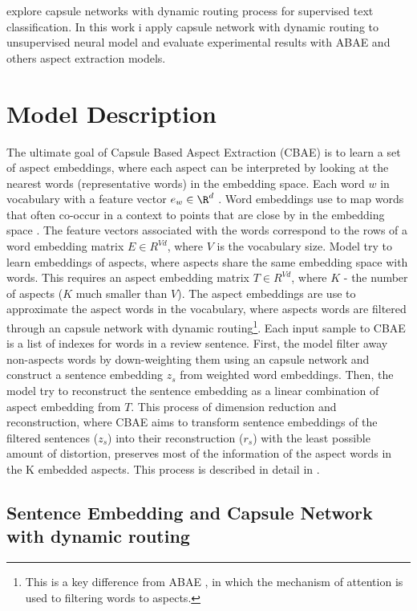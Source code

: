 \documentclass{article}
\begin{document}
\cite{Zhao2018} explore capsule networks with dynamic routing process \cite{Hinton2017DRBC} for supervised text classification. In this work i apply capsule network with dynamic routing to unsupervised neural model and evaluate experimental results with ABAE and others aspect extraction models.

\section{Model Description}

The ultimate goal of Capsule Based Aspect Extraction (CBAE) is to learn a set of aspect embeddings, where each aspect can be interpreted by looking at the nearest words (representative words) in the embedding space. Each word $w$ in vocabulary with a feature vector $e_w \in \R^d$ \cite{He2018ABAE}. Word embeddings use to map words that often co-occur in a context to points that are close by in the embedding space \cite{Mikolov2013W2V}. The feature vectors associated with the words correspond to the rows of a word embedding matrix $E \in R^{Vd}$, where $V$ is the vocabulary size. Model try to learn embeddings of aspects, where aspects share the same embedding space with words. This requires an aspect embedding matrix $T \in R^{Vd}$, where $K$ - the number of aspects ($K$ much smaller than $V$). The aspect embeddings are use to approximate the aspect words in the vocabulary, where aspects words are filtered through an capsule network with dynamic routing\footnote{This is a key difference from ABAE \cite{He2018ABAE} , in which the mechanism of attention is used to filtering words to aspects.}.
Each input sample to CBAE is a list of indexes for words in a review sentence. First, the model filter away non-aspects words by down-weighting them using an capsule network and construct a sentence embedding $z_s$ from weighted word embeddings. Then, the model try to reconstruct the sentence embedding as a linear combination of aspect embedding from $T$. This process of dimension reduction and reconstruction, where CBAE aims to transform sentence embeddings of the filtered sentences ($z_s$) into their reconstruction ($r_s$) with the least possible amount of distortion, preserves most of the information of the aspect words in the K embedded aspects. This process is described in detail in \cite{He2018ABAE}.

\subsection{Sentence Embedding and Capsule Network with dynamic routing}
\end{document}
